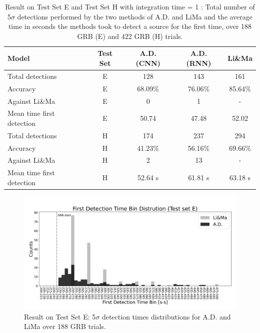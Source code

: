 \begin{table}[ht]
\centering %
\begin{tabular}{l c c c c} %
\hline\hline %
Model & Test Set & A.D. (CNN) & A.D. (RNN) & Li\&Ma \\ [0.5ex] %
\hline %
Total detections & E & 128 & 143 & 161 \\ 
Accuracy & E &  68.09\% & 76.06\% & 85.64\%  \\ 
Against Li\&Ma & E &  0 & 1 & - \\ 
Mean time first detection & E &  50.74 & 47.48 & 52.02  \\ [1ex] %

\hline %
Total detections & H &  174 & 237 & 294 \\
Accuracy & H & 41.23\% & 56.16\% & 69.66\%  \\ 
Against Li\&Ma & H & 2 & 13 & - \\  
Mean time first detection & H & 52.64 s & 61.81 s & 63.18 s \\ [1ex]   

\hline %
\end{tabular}
\caption{Result on Test Set E and Test Set H with integration time = 1 : Total number of 5$\sigma$ detections performed by the two methods of A.D. and LiMa and the average time in seconds the methods took to detect a source for the first time, over 188 GRB (E) and 422 GRB (H) trials.}
\label{tab:Experiment-Results-E-IT-1} 
\end{table}


\begin{figure}[t]
\centering
\includegraphics[width=1\textwidth]{figures/experiments/ad_vs_li_ma_first_detections_testset_e_id_1.png}
\caption{Result on Test Set E: 5$\sigma$ detection times distributions for A.D. and LiMa over 188 GRB trials.}
\label{f:ad-vs-lima-first-detection}
\end{figure}


